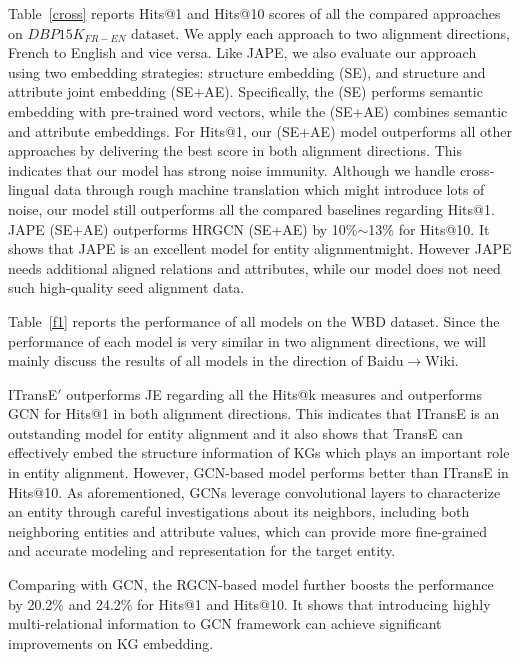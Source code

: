  	Table~\ref{cross} reports Hits@1 and Hits@10 scores of all the compared approaches on $DBP15K_{FR-EN}$ dataset. We apply each approach
 to two alignment directions, French to English and vice versa.  Like JAPE, we also evaluate our approach using two embedding strategies:
 structure embedding (SE), and structure and attribute joint embedding (SE+AE). Specifically, the \HRGCN (SE) performs semantic embedding
 with pre-trained word vectors, while the \HRGCN (SE+AE) combines semantic and attribute embeddings. For Hits@1, our \HRGCN
 (SE+AE) model outperforms all other approaches by delivering the best score in both alignment directions. This indicates that our model has strong noise immunity. Although we handle
 cross-lingual data through rough machine translation which might introduce lots of noise, our model still outperforms all the compared
 baselines regarding Hits@1. JAPE (SE+AE) outperforms HRGCN (SE+AE) by 10\%$\sim$13\% for Hits@10. It shows that JAPE is an 	excellent
 model for entity alignmentmight. However JAPE needs additional aligned relations and attributes, while our model does not need such
 high-quality seed alignment data.


    Table~\ref{f1} reports the performance of all models on the WBD dataset. Since the performance of each model is very similar in two alignment directions, we will mainly discuss the results of all models in the direction of Baidu$\rightarrow$Wiki.

    ITransE$'$ outperforms JE regarding all the Hits@k measures and outperforms GCN for Hits@1 in both alignment directions. This indicates that ITransE is an
outstanding model for entity alignment and it also shows that TransE can effectively embed the structure information of KGs which plays an
important role in entity alignment. However, GCN-based model performs better than ITransE in Hits@10. As aforementioned, GCNs
leverage convolutional layers to characterize an entity through careful investigations about its neighbors, including both neighboring
entities and attribute values, which can provide more fine-grained and accurate modeling and representation for the target entity.


	Comparing with GCN, the RGCN-based model further boosts the performance by 20.2\% and 24.2\% for Hits@1 and Hits@10. It shows that introducing highly multi-relational information to GCN framework can achieve significant improvements on KG embedding.
	

